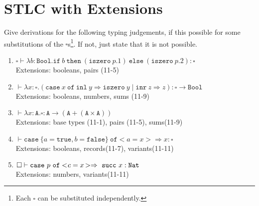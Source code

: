 \section{STLC with Extensions}

Give derivations for the following typing judgements,
if this possible for some substitutions of the $\square$s\footnote{Each $\square$ can be substituted independently.}.
If not, just state that it is not possible.\\
\begin{enumerate}
  \item $\square\vdash \lambda{b:\mathtt{Bool}}. \mathtt{if}\ b\ \mathtt{then}\ (\mathtt{iszero}\ p.1)\ \mathtt{else}\ (\mathtt{iszero}\ p.2) : \square$ 
    \\ Extensions: booleans, pairs (11-5)
  \item $\vdash \lambda{x:\square}. (\mathtt{case}\ x\ \mathtt{of}\ \mathtt{inl}\ y\Rightarrow{\mathtt{iszero}\ y}\mid\mathtt{inr}\ z\Rightarrow{z}) : \square\to\mathtt{Bool}$ \\
    Extensions: booleans, numbers, sums (11-9) 
  \item   $\vdash \lambda{x:\mathtt{A}}. \square : \mathtt{A} \to (\mathtt{A}+(\mathtt{A}\times\mathtt{A})) $\\
    Extensions: base types (11-1), pairs (11-5), sums(11-9) 
  \item $\vdash \mathtt{case}\ \{a=\mathtt{true}, b=\mathtt{false}\}\ \mathtt{of}<a=x>\Rightarrow x : \square $\\
    Extensions: booleans, records(11-7), variants(11-11)
  \item   $\square \vdash \mathtt{case}\ p\ \mathtt{of}<\hspace{-0.2em}c=x\hspace{-0.1em}>\Rightarrow\ \mathtt{succ}\ x : \mathtt{Nat} $ \\
    Extensions: numbers, variants(11-11) 
\end{enumerate}

